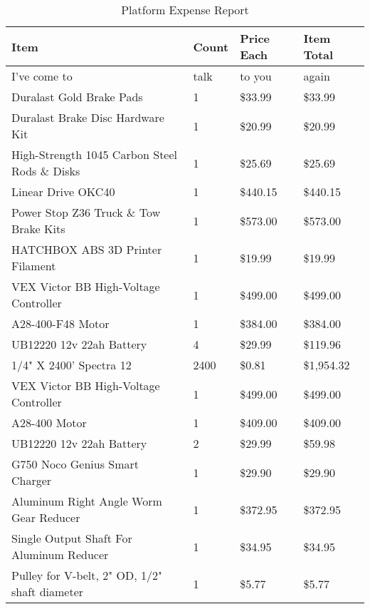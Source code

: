 
\begin{longtable}[H]{| L{8.0cm} | P{1.25cm} | P{2.0cm} | P{2.0cm} |}
\caption{\label{tab:platform_expense_report} Platform Expense Report}

\\ \hline
\textbf{Item}       & \textbf{Count}    & \textbf{Price Each}   & \textbf{Item Total}
\\ \hline

I've come to                            & talk  &  to you   &   again       \\\hline
Duralast Gold Brake Pads                & 1	    & \$33.99	&   \$33.99     \\\hline
Duralast Brake Disc Hardware Kit	    & 1	    & \$20.99	&   \$20.99     \\\hline
High-Strength 1045 Carbon Steel Rods \& Disks & 1 & \$25.69 &   \$25.69     \\\hline
Linear Drive OKC40		                & 1	    & \$440.15	&   \$440.15    \\\hline
Power Stop Z36 Truck \& Tow Brake Kits  & 1	    & \$573.00	&   \$573.00    \\\hline
HATCHBOX ABS 3D Printer Filament	    & 1	    & \$19.99	&   \$19.99     \\\hline
VEX Victor BB High-Voltage Controller   &1	    & \$499.00	&   \$499.00    \\\hline
A28-400-F48 Motor			            & 1	    & \$384.00	&   \$384.00    \\\hline
UB12220 12v 22ah Battery	            & 4	    & \$29.99	&   \$119.96    \\/4" X 2400' Spectra 12	                & 2400	& \$0.81	&   \$1,954.32  \\\hline
VEX Victor BB High-Voltage Controller   & 1	    & \$499.00	&   \$499.00    \\\hline
A28-400 Motor			                & 1	    & \$409.00	&   \$409.00    \\\hline
UB12220 12v 22ah Battery			    & 2	    & \$29.99	&   \$59.98     \\\hline
G750 Noco Genius Smart Charger		    & 1	    & \$29.90	&   \$29.90     \\\hline
Aluminum Right Angle Worm Gear Reducer  & 1	    & \$372.95	&   \$372.95    \\\hline
Single Output Shaft For Aluminum Reducer& 1     & \$34.95	&   \$34.95     \\\hline
Pulley for V-belt, 2" OD, 1/2" shaft diameter&1 & \$5.77	&   \$5.77      \\\hline

\end{longtable}
